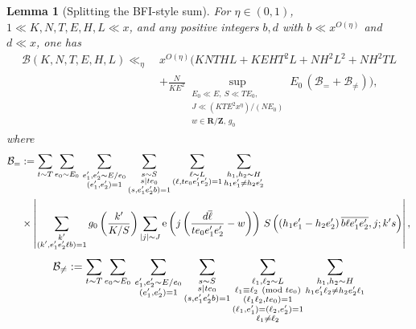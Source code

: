 \documentclass[reqno,11pt]{amsart}
\newtheorem{lemma}[theorem]{Lemma}
\theoremstyle{definition}
\theoremstyle{remark}
\numberwithin{equation}{section}
\newcommand{\Z}{\mathbf{Z}}
\newcommand{\R}{\mathbf{R}}
\newcommand{\mB}{\mathcal{B}}
\newcommand{\e}{\textnormal{e}}
\renewcommand{\bar}{\overline}
\renewcommand{\pmod}[1]{\ (\textnormal{mod } #1)}
\begin{document}
\begin{lemma}[Splitting the BFI-style sum] \label{lem:splitting-bfi}
For $\eta \in (0, 1)$, $1 \ll K, N, T, E, H, L \ll x$, and any positive integers $b, d$ with $b \ll x^{O(\eta)}$ and $d \ll x$, one has
\[
\begin{aligned}
    \mB(K, N, T, E, H, L) \ll_\eta\ 
    &
    x^{O(\eta)} \Bigg( KNTHL + KEHT^2L + N H^2 L^2 + N H^2 T L
    \\
    &+ \frac{N}{KE^2} \sup_{\substack{E_0 \ll E,\ S \ll TE_0, \\ J \ll (K T E^2 x^\eta)/(NE_0) \\ w \in \R/\Z,\, g_0}} E_0\, (\mB_= + \mB_{\neq}) \Bigg),
\end{aligned}
\]
where
\[
\begin{aligned}
    \mB_= &:=
    \sum_{t \sim T} \sum_{e_0 \sim E_0}\,
    \sum_{\substack{e_1', e_2' \sim E/e_0 \\ (e_1', e_2') = 1}}
    \sum_{\substack{s \sim S \\ s \mid te_0 \\ (s, e_1'e_2'b) = 1}}
    \sum_{\substack{\ell \sim L \\ (\ell, te_0e_1'e_2') = 1}} 
    \sum_{\substack{h_1, h_2 \sim H \\ h_1e_1' \neq h_2e_2'}}
    \\
    &\times
    \left\vert 
    \sum_{\substack{k' \\ (k', e_1'e_2'\ell b) = 1}} g_0 \left(\frac{k'}{K/S}\right) 
    \sum_{|j| \sim J}
    \e\left(j \left(\frac{d \bar{\ell}}{te_0e_1'e_2'} - w\right)\right)\, S\left( (h_1e_1' - h_2e_2')\, \bar{b \ell e_1' e_2'}, j; k's \right)
    \right\vert,
\end{aligned}
\]
\[
\begin{aligned}
    \mB_{\neq} &:=
    \sum_{t \sim T} \sum_{e_0 \sim E_0}\,
    \sum_{\substack{e_1', e_2' \sim E/e_0 \\ (e_1', e_2') = 1}}
    \sum_{\substack{s \sim S \\ s \mid te_0 \\ (s, e_1'e_2'b) = 1}}
    \sum_{\substack{\ell_1, \ell_2 \sim L \\ \ell_1 \equiv \ell_2 \pmod{te_0} \\ (\ell_1 \ell_2, te_0) = 1 \\ (\ell_1, e_1') = (\ell_2, e_2') = 1 \\ \ell_1 \neq \ell_2}} 
    \sum_{\substack{h_1, h_2 \sim H \\ h_1e_1'\ell_2 \neq h_2e_2'\ell_1}}
    \\

\end{aligned}\]
\end{lemma}
\end{document}
